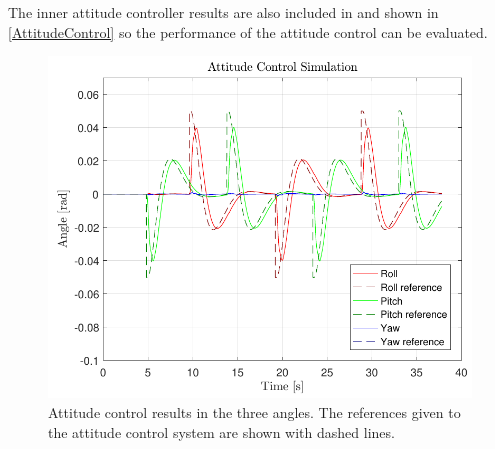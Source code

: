 The inner attitude controller results are also included in and shown in \autoref{AttitudeControl} so the performance of the attitude control can be evaluated. 
\begin{figure}[H]
	\centering
	\includegraphics[scale=0.35]{figures/AttitudeControl}
	\caption{Attitude control results in the three angles. The references given to the attitude control system are shown with dashed lines.}
	\label{AttitudeControl}
\end{figure}


